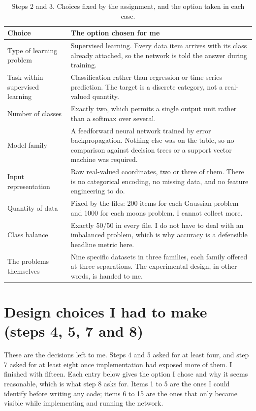 \documentclass[11pt]{article}
\begin{document}
\begin{table}[H]
\centering
\small
\begin{tabular}{p{5.1cm}p{9.4cm}}
\toprule
\textbf{Choice} & \textbf{The option chosen for me} \\
\midrule
Type of learning problem &
Supervised learning. Every data item arrives with its class already attached,
so the network is told the answer during training. \\
\addlinespace
Task within supervised learning &
Classification rather than regression or time-series prediction. The target is
a discrete category, not a real-valued quantity. \\
\addlinespace
Number of classes &
Exactly two, which permits a single output unit rather than a softmax over
several. \\
\addlinespace
Model family &
A feedforward neural network trained by error backpropagation. Nothing else
was on the table, so no comparison against decision trees or a support vector
machine was required. \\
\addlinespace
Input representation &
Raw real-valued coordinates, two or three of them. There is no categorical
encoding, no missing data, and no feature engineering to do. \\
\addlinespace
Quantity of data &
Fixed by the files: 200 items for each Gaussian problem and 1000 for each
moons problem. I cannot collect more. \\
\addlinespace
Class balance &
Exactly 50/50 in every file. I do not have to deal with an imbalanced problem,
which is why accuracy is a defensible headline metric here. \\
\addlinespace
The problems themselves &
Nine specific datasets in three families, each family offered at three
separations. The experimental design, in other words, is handed to me. \\
\bottomrule
\end{tabular}
\caption{Steps 2 and 3. Choices fixed by the assignment, and the option taken
in each case.}
\end{table}

\section{Design choices I had to make (steps 4, 5, 7 and 8)}
\label{sec:mine}

These are the decisions left to me. Steps 4 and 5 asked for at least four, and
step 7 asked for at least eight once implementation had exposed more of them. I
finished with fifteen. Each entry below gives the option I chose and why it
seems reasonable, which is what step 8 asks for. Items 1 to 5 are the ones I could identify before
writing any code; items 6 to 15 are the ones that only became visible while
implementing and running the network.
\end{document}
